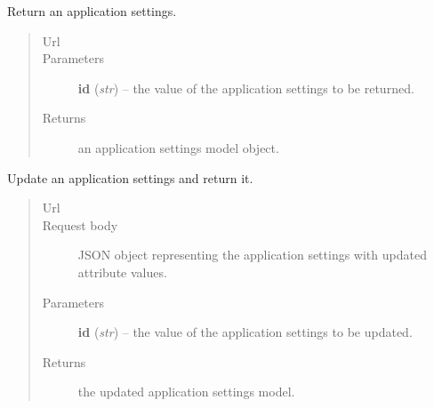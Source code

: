 \documentclass[letterpaper,10pt,english]{sphinxmanual}
\begin{document}
\begin{fulllineitems}

\begin{fulllineitems}
\label{api:onlinelinguisticdatabase.controllers.applicationsettings.ApplicationsettingsController.show}
Return an application settings.
\begin{quote}\begin{description}
\item[{Url }] \leavevmode
{}

\item[{Parameters}] \leavevmode
\textbf{id} (\emph{str}) -- the  value of the application settings to be returned.

\item[{Returns}] \leavevmode
an application settings model object.

\end{description}\end{quote}

\end{fulllineitems}


\begin{fulllineitems}
\label{api:onlinelinguisticdatabase.controllers.applicationsettings.ApplicationsettingsController.update}
Update an application settings and return it.
\begin{quote}\begin{description}
\item[{Url }] \leavevmode
{}

\item[{Request body}] \leavevmode
JSON object representing the application settings with updated attribute values.

\item[{Parameters}] \leavevmode
\textbf{id} (\emph{str}) -- the  value of the application settings to be updated.

\item[{Returns}] \leavevmode
the updated application settings model.

\end{description}\end{quote}

\end{fulllineitems}


\end{fulllineitems}
\end{document}
